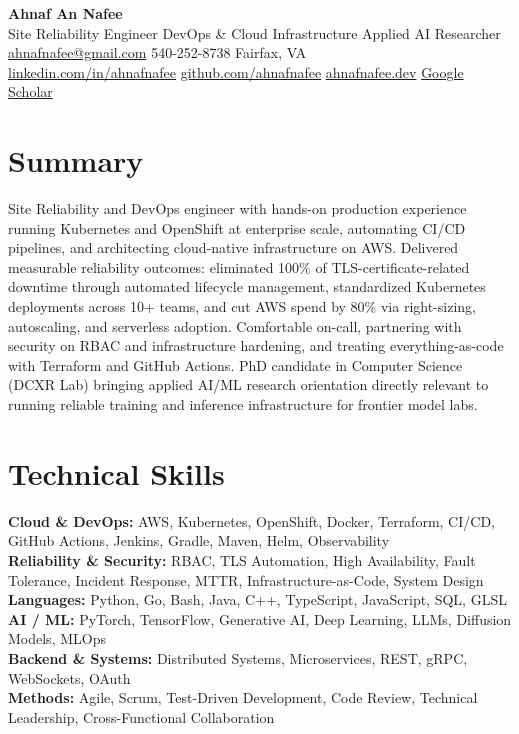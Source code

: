 \documentclass[letterpaper,10pt]{article}
\begin{document}
\begin{center}
  {\LARGE\bfseries\color{accent} Ahnaf An Nafee }\\[3pt]
  {\normalsize Site Reliability Engineer \textbar{} DevOps \& Cloud Infrastructure \textbar{} Applied AI Researcher }\\[4pt]
  \small
  \href{mailto:ahnafnafee@gmail.com}{ahnafnafee@gmail.com} \textbar{}
  540-252-8738 \textbar{}
  Fairfax, VA\\
  \href{https://linkedin.com/in/ahnafnafee}{linkedin.com/in/ahnafnafee} \textbar{}
  \href{https://github.com/ahnafnafee}{github.com/ahnafnafee} \textbar{}
  \href{https://www.ahnafnafee.dev/}{ahnafnafee.dev} \textbar{} \href{https://scholar.google.com/citations?user=u15DO0cAAAAJ}{Google Scholar}
\end{center}

\section*{Summary}
Site Reliability and DevOps engineer with hands-on production experience running Kubernetes and OpenShift at enterprise scale, automating CI/CD pipelines, and architecting cloud-native infrastructure on AWS. Delivered measurable reliability outcomes: eliminated 100\% of TLS-certificate-related downtime through automated lifecycle management, standardized Kubernetes deployments across 10+ teams, and cut AWS spend by 80\% via right-sizing, autoscaling, and serverless adoption. Comfortable on-call, partnering with security on RBAC and infrastructure hardening, and treating everything-as-code with Terraform and GitHub Actions. PhD candidate in Computer Science (DCXR Lab) bringing applied AI/ML research orientation directly relevant to running reliable training and inference infrastructure for frontier model labs.

\section*{Technical Skills}
\textbf{Cloud \& DevOps:} AWS, Kubernetes, OpenShift, Docker, Terraform, CI/CD, GitHub Actions, Jenkins, Gradle, Maven, Helm, Observability\\
\textbf{Reliability \& Security:} RBAC, TLS Automation, High Availability, Fault Tolerance, Incident Response, MTTR, Infrastructure-as-Code, System Design\\
\textbf{Languages:} Python, Go, Bash, Java, C++, TypeScript, JavaScript, SQL, GLSL\\
\textbf{AI / ML:} PyTorch, TensorFlow, Generative AI, Deep Learning, LLMs, Diffusion Models, MLOps\\
\textbf{Backend \& Systems:} Distributed Systems, Microservices, REST, gRPC, WebSockets, OAuth\\
\textbf{Methods:} Agile, Scrum, Test-Driven Development, Code Review, Technical Leadership, Cross-Functional Collaboration
\end{document}
